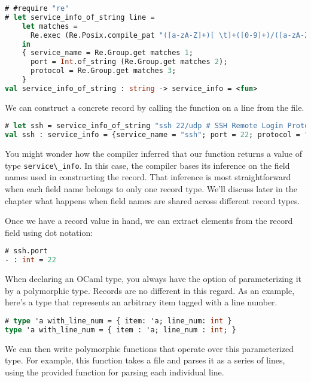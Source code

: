 \begin{lstlisting}[language=Caml]
# #require "re"
# let service_info_of_string line =
    let matches =
      Re.exec (Re.Posix.compile_pat "([a-zA-Z]+)[ \t]+([0-9]+)/([a-zA-Z]+)") line
    in
    { service_name = Re.Group.get matches 1;
      port = Int.of_string (Re.Group.get matches 2);
      protocol = Re.Group.get matches 3;
    }
val service_info_of_string : string -> service_info = <fun>
\end{lstlisting}

We can construct a concrete record by calling the function on a line
from the file.

\begin{lstlisting}[language=Caml]
# let ssh = service_info_of_string "ssh 22/udp # SSH Remote Login Protocol"
val ssh : service_info = {service_name = "ssh"; port = 22; protocol = "udp"}
\end{lstlisting}

You might wonder how the compiler inferred that our function returns a
value of type \passthrough{\lstinline!service\_info!}. In this case, the
compiler bases its inference on the field names used in constructing the
record. That inference is most straightforward when each field name
belongs to only one record type. We'll discuss later in the chapter what
happens when field names are shared across different record types.

Once we have a record value in hand, we can extract elements from the
record field using dot notation:

\begin{lstlisting}[language=Caml]
# ssh.port
- : int = 22
\end{lstlisting}

When declaring an OCaml type, you always have the option of
parameterizing it by a polymorphic type. Records are no different in
this regard. As an example, here's a type that represents an arbitrary
item tagged with a line number.

\begin{lstlisting}[language=Caml]
# type 'a with_line_num = { item: 'a; line_num: int }
type 'a with_line_num = { item : 'a; line_num : int; }
\end{lstlisting}

We can then write polymorphic functions that operate over this
parameterized type. For example, this function takes a file and parses
it as a series of lines, using the provided function for parsing each
individual line.

